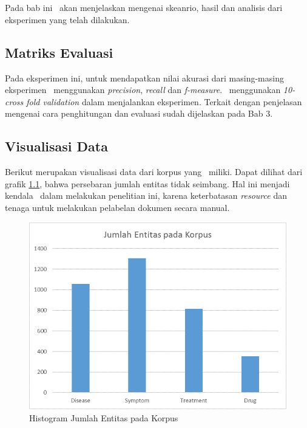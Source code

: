 \chapter{\babLima}

Pada bab ini \saya~akan menjelaskan mengenai skeanrio, hasil dan analisis dari eksperimen yang telah dilakukan.

\section{Matriks Evaluasi}
Pada eksperimen ini, untuk mendapatkan nilai akurasi dari masing-masing eksperimen \saya~menggunakan \textit{precision}, \textit{recall} dan \textit{f-measure}. \Saya~menggunakan \textit{10-cross fold validation} dalam menjalankan eksperimen. Terkait dengan penjelasan mengenai cara penghitungan dan evaluasi sudah dijelaskan pada Bab 3.

\section{Visualisasi Data}
Berikut merupakan visualisasi data dari korpus yang \saya~miliki. Dapat dilihat dari grafik \ref{fig:korpus}, bahwa persebaran jumlah entitas tidak seimbang. Hal ini menjadi kendala \saya~dalam melakukan penelitian ini, karena keterbatasan \textit{resource} dan tenaga untuk melakukan pelabelan dokumen secara manual.
\begin{figure}
	\centering
	\includegraphics[width=0.85\linewidth]{images/histogramentitaskorpus}
	\caption{Histogram Jumlah Entitas pada Korpus}
	\label{fig:korpus}
\end{figure}

